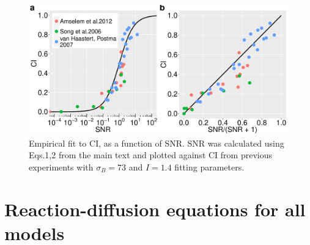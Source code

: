 \documentclass[10pt]{article}
\begin{document}
\begin{figure}[ht!]
	\centering
	\includegraphics[scale=0.3]{../figures/si_ci_vs_snr_mm_fit}
	\caption{
		Empirical fit to CI, as a function of SNR. SNR was calculated using Eqs.1,2 from the main text and plotted against CI from previous experiments \cite{song, eberhard1, fuller-1} with $\sigma_B = 73$ and $I = 1.4$ fitting parameters.
	}
	\label{fig:ci_vs_snr}
\end{figure}





\section{Reaction-diffusion equations for all models}
\end{document}
